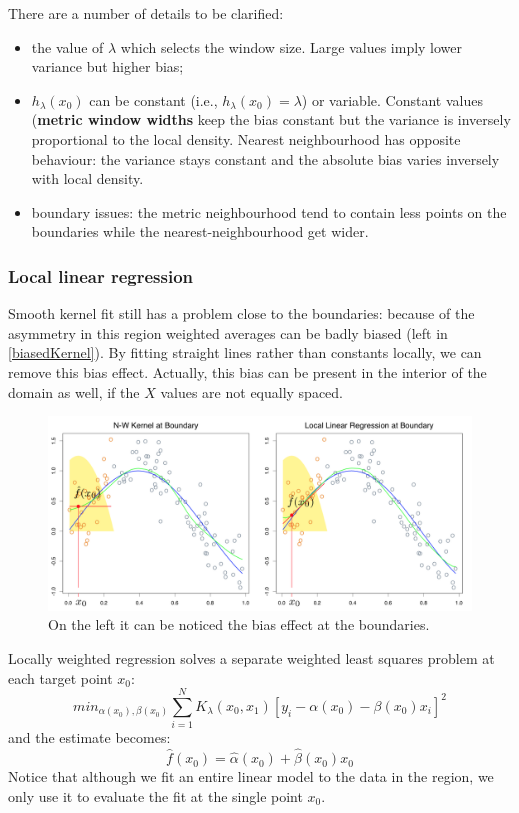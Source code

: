 There are a number of details to be clarified:
\begin{itemize}
\item the value of $\lambda$ which selects the window size. Large values imply lower variance but higher bias;
\item $h_\lambda(x_0)$ can be constant (i.e., $h_\lambda(x_0)=\lambda$) or variable. Constant values (\textbf{metric window widths} keep the bias constant but the variance is inversely proportional to the local density. Nearest neighbourhood has opposite behaviour: the variance stays constant and the absolute bias varies inversely with local density.
\item boundary issues: the metric neighbourhood tend to contain less points on the boundaries while the nearest-neighbourhood get wider.
\end{itemize}

\subsubsection{Local linear regression}
Smooth kernel fit still has a problem close to the boundaries: because of the asymmetry in this region weighted averages can be badly biased (left in \autoref{biasedKernel}). By fitting straight lines rather than constants locally, we can remove this bias effect. Actually, this bias can be present in the interior of the domain as well, if the $X$ values are not equally spaced.
\begin{figure}
\includegraphics[scale=0.4]{img/biasedKernel}
\caption{On the left it can be noticed the bias effect at the boundaries.}
\label{biasedKernel}
\end{figure}
Locally weighted regression solves a separate weighted least squares problem at each target point $x_0$:
\begin{equation}
min_{\alpha(x_0), \beta(x_0)} \sum_{i=1}^N K_\lambda(x_0,x_1)\left[ y_i - \alpha(x_0) -\beta(x_0)x_i\right]^2
\end{equation}
and the estimate becomes:
\begin{equation}
\hat{f}(x_0) = \hat{\alpha}(x_0) + \hat{\beta}(x_0) x_0
\end{equation}
Notice that although we fit an entire linear model to the data in the region, we only use it to evaluate the fit at the single point $x_0$.

